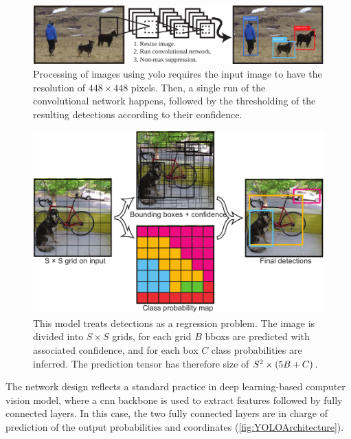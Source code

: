 \begin{figure}[t]
    \centerline{\includegraphics[width=0.8\linewidth]{figures/theoretical_foundations/yolo_general_idea.pdf}}
    \caption[\Gls{yolo} processing pipeline]{Processing of images using \gls{yolo} requires the input image to have the resolution of $448 \times 448$ pixels. Then, a single run of the convolutional network happens, followed by the thresholding of the resulting detections according to their confidence. }
    \label{fig:YOLOGeneralIdea}
\end{figure}

\begin{figure}[t]
    \centerline{\includegraphics[width=0.8\linewidth]{figures/theoretical_foundations/yolo_bboxes_progression.pdf}}
    \caption[\Gls{yolo} detections]{This model treats detections as a regression problem. The image is divided into $S \times S$ grids, for each grid $B$ \glspl{bbox} are predicted with associated confidence, and for each box $C$ class probabilities are inferred. The prediction tensor has therefore size of $S^2 \times \left( {5B + C} \right)$. }
    \label{fig:YOLOBBOXESProgression}
\end{figure}

The network design reflects a standard practice in deep learning-based computer vision model, where a \gls{cnn} backbone is used to extract features followed by fully connected layers. In this case, the two fully connected layers are in charge of prediction of the output probabilities and coordinates (\cref{fig:YOLOArchitecture}).

